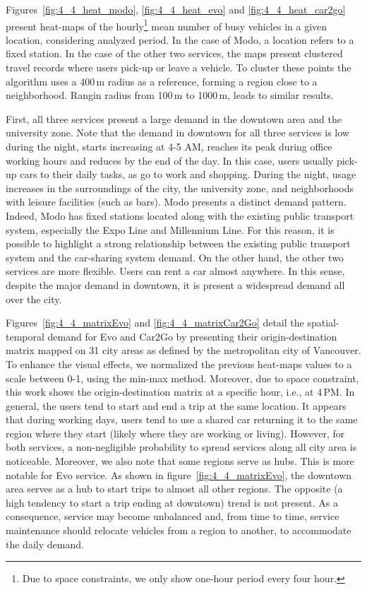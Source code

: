 Figures~\ref{fig:4_4_heat_modo}, \ref{fig:4_4_heat_evo} and \ref{fig:4_4_heat_car2go} present heat-maps of the hourly\footnote{Due to space constraints, we only show one-hour period every four hour.} mean number of busy vehicles in a given location, considering analyzed period. In the case of Modo, a location refers to a fixed station. In the case of the other two services, the maps present clustered travel records where users pick-up or leave a vehicle. To cluster these points the algorithm uses a 400\,m radius as a reference, forming a region close to a neighborhood. Rangin radius from 100\,m to 1000\,m, leads to similar results. 

First, all three services present a large demand in the downtown area and the university zone. Note that the demand in downtown for all three services is low during the night, starts increasing at 4-5 AM, reaches its peak during office working hours and reduces by the end of the day. In this case, users usually pick-up cars to their daily tasks, as go to work and shopping. During the night, usage increases in the surroundings of the city, the university zone, and neighborhoods with leisure facilities (such as bars). 
Modo presents a distinct demand pattern. Indeed, Modo has fixed stations located along with the existing public transport system, especially the Expo Line and Millennium Line. For this reason, it is possible to highlight a strong relationship between the existing public transport system and the car-sharing system demand. On the other hand, the other two services are more flexible. Users can rent a car almost anywhere. In this sense, despite the major demand in downtown, it is present a widespread demand all over the city.

Figures~\ref{fig:4_4_matrixEvo} and \ref{fig:4_4_matrixCar2Go} detail the spatial-temporal demand for Evo and Car2Go by presenting their origin-destination matrix mapped on 31 city areas as defined by the metropolitan city of Vancouver. To enhance the visual effects, we normalized the previous heat-maps values to a scale between 0-1, using the min-max method. Moreover, due to space constraint, this work shows the origin-destination matrix at a specific hour, i.e., at 4\,PM.
In general, the users tend to start and end a trip at the same location. It appears that during working days, users tend to use a shared car  returning it to the same region where they start (likely where they are working or living). However, for both services, a non-negligible probability to spread services along all city area is noticeable. 
Moreover, we also note that some regions serve as hubs. This is more notable for Evo service. As shown in figure~\ref{fig:4_4_matrixEvo}, the downtown area serves as a hub to start trips to almost all other regions. The opposite (a high tendency to start a trip ending at downtown) trend is not present. As a consequence, service may become unbalanced and, from time to time, service maintenance should relocate vehicles from a region to another, to accommodate the daily demand.

